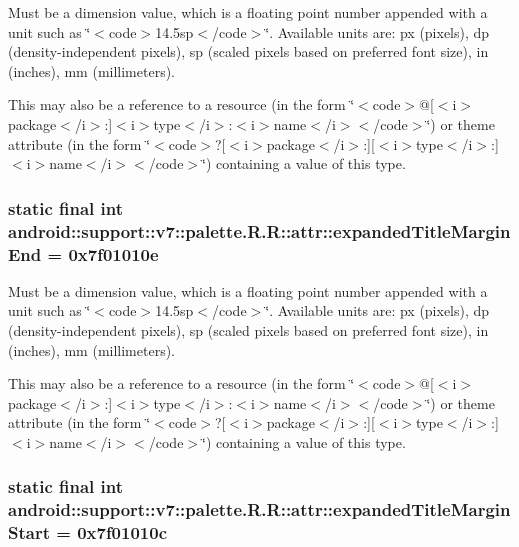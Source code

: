 Must be a dimension value, which is a floating point number appended with a unit such as \char`\"{}$<$code$>$14.5sp$<$/code$>$\char`\"{}. Available units are: px (pixels), dp (density-independent pixels), sp (scaled pixels based on preferred font size), in (inches), mm (millimeters). 

This may also be a reference to a resource (in the form \char`\"{}$<$code$>$@\mbox{[}$<$i$>$package$<$/i$>$:\mbox{]}$<$i$>$type$<$/i$>$:$<$i$>$name$<$/i$>$$<$/code$>$\char`\"{}) or theme attribute (in the form \char`\"{}$<$code$>$?\mbox{[}$<$i$>$package$<$/i$>$:\mbox{]}\mbox{[}$<$i$>$type$<$/i$>$:\mbox{]}$<$i$>$name$<$/i$>$$<$/code$>$\char`\"{}) containing a value of this type. \hypertarget{classandroid_1_1support_1_1v7_1_1palette_1_1_r_1_1attr_f36a7a652ba8a476989cf3d7a9ca544c}{
\subsubsection[{expandedTitleMarginEnd}]{\setlength{\rightskip}{0pt plus 5cm}static final int android::support::v7::palette.R.R::attr::expandedTitleMarginEnd = 0x7f01010e}}
\label{classandroid_1_1support_1_1v7_1_1palette_1_1_r_1_1attr_f36a7a652ba8a476989cf3d7a9ca544c}


Must be a dimension value, which is a floating point number appended with a unit such as \char`\"{}$<$code$>$14.5sp$<$/code$>$\char`\"{}. Available units are: px (pixels), dp (density-independent pixels), sp (scaled pixels based on preferred font size), in (inches), mm (millimeters). 

This may also be a reference to a resource (in the form \char`\"{}$<$code$>$@\mbox{[}$<$i$>$package$<$/i$>$:\mbox{]}$<$i$>$type$<$/i$>$:$<$i$>$name$<$/i$>$$<$/code$>$\char`\"{}) or theme attribute (in the form \char`\"{}$<$code$>$?\mbox{[}$<$i$>$package$<$/i$>$:\mbox{]}\mbox{[}$<$i$>$type$<$/i$>$:\mbox{]}$<$i$>$name$<$/i$>$$<$/code$>$\char`\"{}) containing a value of this type. \hypertarget{classandroid_1_1support_1_1v7_1_1palette_1_1_r_1_1attr_41b9bb9b99a676048b9a8e3108c89bb5}{
\subsubsection[{expandedTitleMarginStart}]{\setlength{\rightskip}{0pt plus 5cm}static final int android::support::v7::palette.R.R::attr::expandedTitleMarginStart = 0x7f01010c}}
\label{classandroid_1_1support_1_1v7_1_1palette_1_1_r_1_1attr_41b9bb9b99a676048b9a8e3108c89bb5}


